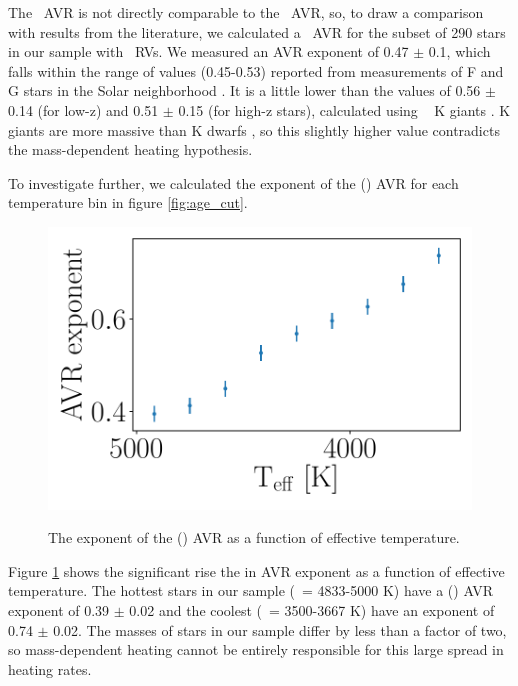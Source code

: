 The \vb\ AVR is not directly comparable to the \vz\ AVR, so, to draw a
comparison with results from the literature, we calculated a \vz\ AVR for
the subset of 290 stars in our sample with \gaia\ RVs.
We measured an AVR exponent of 0.47 $\pm$ 0.1, which falls within the range of
values (0.45-0.53) reported from measurements of F and G stars in the Solar
neighborhood \citep{holmberg2009, aumer2009, aumer2016}.
It is a little lower than the values of 0.56 $\pm$ 0.14 (for low-z) and 0.51
$\pm$ 0.15 (for high-z stars), calculated using \LAMOST\  K giants \citep{yu2018}.
K giants are more massive than K dwarfs ,
so this slightly higher value contradicts the mass-dependent heating
hypothesis.

To investigate further, we calculated the exponent of the (\vb) AVR for each
temperature bin in figure \ref{fig:age_cut}.
\begin{figure}
  \caption{
      The exponent of the (\vb) AVR as a function of effective temperature.
}
  \centering
    \includegraphics[width=1\textwidth]{AVR_exponent}
\label{fig:AVR_exponent}
\end{figure}
Figure \ref{fig:AVR_exponent} shows the significant rise the in AVR exponent
as a function of effective temperature.
The hottest stars in our sample (\teff\ = 4833-5000 K) have a (\vb) AVR
exponent of 0.39 $\pm$ 0.02 and the coolest (\teff\ = 3500-3667 K) have an
exponent of 0.74 $\pm$ 0.02.
The masses of stars in our sample differ by less than a factor of two,
so mass-dependent heating cannot be entirely responsible for this large spread
in heating rates.


